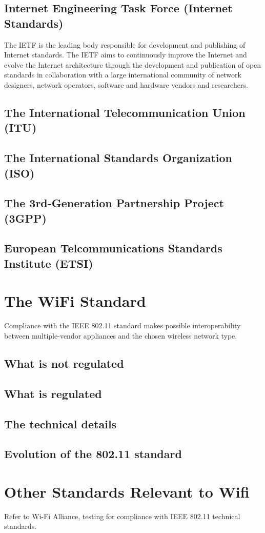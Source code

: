 \subsection{Internet Engineering Task Force (Internet Standards)}

The IETF is the leading body responsible for development and publishing of Internet standards. The IETF aims to continuously improve the Internet and evolve the Internet architecture through the development and publication of open standards in collaboration with a large international community of network designers, network operators, software and hardware vendors and researchers. 

\subsection{The International Telecommunication Union (ITU)}\label{ITU}

\subsection{The International Standards Organization (ISO)}

\subsection{The 3rd-Generation Partnership Project (3GPP)}

\subsection{European Telcommunications Standards Institute (ETSI)}\label{ETSI}

\section{The WiFi Standard}

Compliance with the IEEE 802.11 standard makes possible interoperability between multiple-vendor appliances and the chosen wireless network type.

\subsection{What is not regulated}

\subsection{What is regulated}

\subsection{The technical details}

\subsection{Evolution of the 802.11 standard}

\section{Other Standards Relevant to Wifi}

Refer to Wi-Fi Alliance, testing for compliance with IEEE 802.11 technical standards.